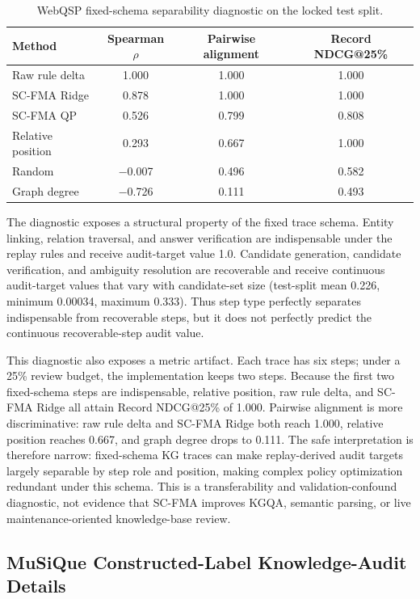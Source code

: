 \documentclass[pdflatex,sn-mathphys-num]{sn-jnl}
\begin{document}
\begin{table}[ht]
\caption{WebQSP fixed-schema separability diagnostic on the locked test split.}
\label{tab:supp-webqsp-diagnostic}
\centering
\small
\begin{tabular}{lccc}
\toprule
\textbf{Method} & \textbf{Spearman $\rho$} & \textbf{Pairwise alignment} & \textbf{Record NDCG@25\%} \\
\midrule
Raw rule delta & 1.000 & 1.000 & 1.000 \\
SC-FMA Ridge & 0.878 & 1.000 & 1.000 \\
SC-FMA QP & 0.526 & 0.799 & 0.808 \\
Relative position & 0.293 & 0.667 & 1.000 \\
Random & $-$0.007 & 0.496 & 0.582 \\
Graph degree & $-$0.726 & 0.111 & 0.493 \\
\bottomrule
\end{tabular}
\end{table}

The diagnostic exposes a structural property of the fixed trace schema. Entity linking, relation traversal, and answer verification are indispensable under the replay rules and receive audit-target value 1.0. Candidate generation, candidate verification, and ambiguity resolution are recoverable and receive continuous audit-target values that vary with candidate-set size (test-split mean 0.226, minimum 0.00034, maximum 0.333). Thus step type perfectly separates indispensable from recoverable steps, but it does not perfectly predict the continuous recoverable-step audit value.

This diagnostic also exposes a metric artifact. Each trace has six steps; under a 25\% review budget, the implementation keeps two steps. Because the first two fixed-schema steps are indispensable, relative position, raw rule delta, and SC-FMA Ridge all attain Record NDCG@25\% of 1.000. Pairwise alignment is more discriminative: raw rule delta and SC-FMA Ridge both reach 1.000, relative position reaches 0.667, and graph degree drops to 0.111. The safe interpretation is therefore narrow: fixed-schema KG traces can make replay-derived audit targets largely separable by step role and position, making complex policy optimization redundant under this schema. This is a transferability and validation-confound diagnostic, not evidence that SC-FMA improves KGQA, semantic parsing, or live maintenance-oriented knowledge-base review.

\subsection{MuSiQue Constructed-Label Knowledge-Audit Details}
\label{app:musique-knowledge-audit}
\end{document}
